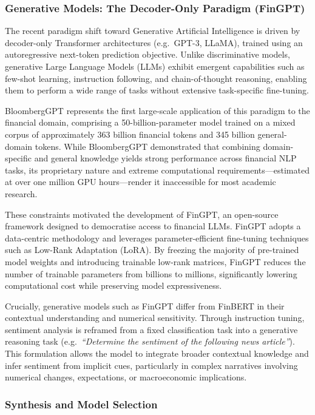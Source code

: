 \documentclass[singlespace]{ucetd}
\begin{document}
\subsubsection{Generative Models: The Decoder-Only Paradigm (FinGPT)}

The recent paradigm shift toward Generative Artificial Intelligence is driven by decoder-only Transformer architectures (e.g.\ GPT-3, LLaMA), trained using an autoregressive next-token prediction objective. Unlike discriminative models, generative Large Language Models (LLMs) exhibit emergent capabilities such as few-shot learning, instruction following, and chain-of-thought reasoning, enabling them to perform a wide range of tasks without extensive task-specific fine-tuning.

BloombergGPT represents the first large-scale application of this paradigm to the financial domain, comprising a 50-billion-parameter model trained on a mixed corpus of approximately 363 billion financial tokens and 345 billion general-domain tokens. While BloombergGPT demonstrated that combining domain-specific and general knowledge yields strong performance across financial NLP tasks, its proprietary nature and extreme computational requirements—estimated at over one million GPU hours—render it inaccessible for most academic research.

These constraints motivated the development of FinGPT, an open-source framework designed to democratise access to financial LLMs. FinGPT adopts a data-centric methodology and leverages parameter-efficient fine-tuning techniques such as Low-Rank Adaptation (LoRA). By freezing the majority of pre-trained model weights and introducing trainable low-rank matrices, FinGPT reduces the number of trainable parameters from billions to millions, significantly lowering computational cost while preserving model expressiveness.

Crucially, generative models such as FinGPT differ from FinBERT in their contextual understanding and numerical sensitivity. Through instruction tuning, sentiment analysis is reframed from a fixed classification task into a generative reasoning task (e.g.\ \emph{``Determine the sentiment of the following news article''}). This formulation allows the model to integrate broader contextual knowledge and infer sentiment from implicit cues, particularly in complex narratives involving numerical changes, expectations, or macroeconomic implications.

\subsubsection{Synthesis and Model Selection}
\end{document}
